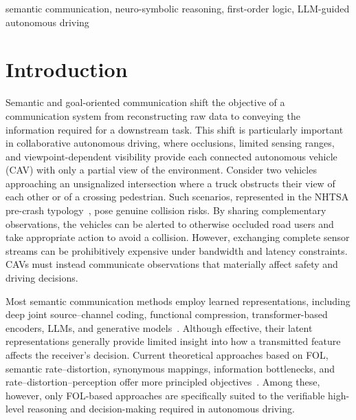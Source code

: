 \documentclass[10pt, conference, letterpaper]{ IEEEtran}
\theoremstyle{bfnote}
\begin{document}
\begin{IEEEkeywords}
semantic communication, neuro-symbolic reasoning, first-order logic, LLM-guided autonomous driving
\end{IEEEkeywords}


\section{Introduction}
\label{sec:introduction}

Semantic and goal-oriented communication shift the objective of a communication system from reconstructing raw data to conveying the information required for a downstream task. This shift is particularly important in collaborative autonomous driving, where occlusions, limited sensing ranges, and viewpoint-dependent visibility provide each connected autonomous vehicle (CAV) with only a partial view of the environment. Consider two vehicles approaching an unsignalized intersection where a truck obstructs their view of each other or of a crossing pedestrian. Such scenarios, represented in the NHTSA pre-crash typology~\cite{najm2007precrash}, pose genuine collision risks. By sharing complementary observations, the vehicles can be alerted to otherwise occluded road users and take appropriate action to avoid a collision. However, exchanging complete sensor streams can be prohibitively expensive under bandwidth and latency constraints. CAVs must instead communicate observations that materially affect safety and driving decisions.

Most semantic communication methods employ learned representations, including deep joint source--channel coding, functional compression, transformer-based encoders, LLMs, and generative models~\cite{Xie2020DeepLE,Yang2023SwinJSCCTS,Liu2024ANI,Wang2024LargeLanguageModelEnabledTS, Saidutta2022AML, yashas}. Although effective, their latent representations generally provide limited insight into how a transmitted feature affects the receiver's decision. Current theoretical approaches based on FOL, semantic rate--distortion, synonymous mappings, information bottlenecks, and rate--distortion--perception offer more principled objectives~\cite{Shao2022ATO,Niu2024AMT,Niu2025RateDistortionPerceptionTI,Saz2024OnTT,Saz2024LossySC,Saz2025DISCDDL,Saz2025AnalysisOS, saz2026goal}. Among these, however, only FOL-based approaches are specifically suited to the verifiable high-level reasoning and decision-making required in autonomous driving.
\end{document}
